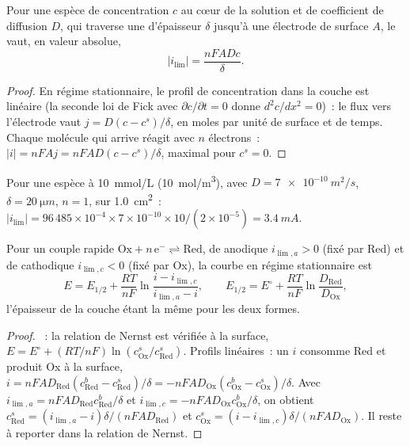 \begin{theorem}\label{thm:b2:current-potential-curves:limiting}
Pour une espèce de concentration $c$ au cœur de la solution et de coefficient de diffusion $D$,
qui traverse une  d'épaisseur $\delta$ jusqu'à une électrode de surface $A$,
le  vaut, en valeur absolue,
\[
  |i_{\lim}| = \frac{nFADc}{\delta} .
\]
\end{theorem}

\begin{proof}
En régime stationnaire, le profil de concentration dans la couche est linéaire (la seconde
loi de Fick avec $\partial c/\partial t = 0$ donne $d^2c/dx^2 = 0$)~: le flux
vers l'électrode vaut $j = D(c - c^s)/\delta$, en moles par unité de surface et de
temps. Chaque molécule qui arrive réagit avec $n$ électrons~: $|i| = nFAj =
nFAD(c - c^s)/\delta$, maximal pour $c^s = 0$.
\end{proof}

\begin{example}\label{ex:b2:current-potential-curves:ilim}
Pour une espèce à \qty{10}{mmol/L} (\qty{10}{mol/m^3}), avec $D =
\qty{7e-10}{m^2/s}$, $\delta = \qty{20}{\micro m}$, $n = 1$, sur
\qty{1.0}{cm^2}~: $|i_{\lim}| = 96\,485 \times 10^{-4} \times 7 \times 10^{-10}
\times 10/(2 \times 10^{-5}) = \qty{3.4}{mA}$.
\end{example}

\begin{theorem}\label{thm:b2:current-potential-curves:wave}
Pour un couple rapide $\mathrm{Ox} + n\,\mathrm e^- \rightleftharpoons \mathrm{Red}$,
de  anodique $i_{\lim,a} > 0$ (fixé par Red) et de 
cathodique $i_{\lim,c} < 0$ (fixé par Ox), la courbe en régime stationnaire est
\[
  E = E_{1/2} + \frac{RT}{nF}\ln\frac{i - i_{\lim,c}}{i_{\lim,a} - i},
  \qquad E_{1/2} = E^\circ + \frac{RT}{nF}\ln\frac{D_{\text{Red}}}{D_{\text{Ox}}} ,
\]
l'épaisseur de la couche étant la même pour les deux formes.
\end{theorem}

\begin{proof}
~: la relation de Nernst est vérifiée à la surface, $E = E^\circ + (RT/nF)
\ln(c^s_{\text{Ox}}/c^s_{\text{Red}})$. Profils linéaires~: un  $i$
consomme Red et produit Ox à la surface, $i = nFAD_{\text{Red}}(c^b_{\text{Red}}
- c^s_{\text{Red}})/\delta = -nFAD_{\text{Ox}}(c^b_{\text{Ox}} - c^s_{\text{Ox}})/\delta$.
Avec $i_{\lim,a} = nFAD_{\text{Red}}c^b_{\text{Red}}/\delta$ et $i_{\lim,c} =
-nFAD_{\text{Ox}}c^b_{\text{Ox}}/\delta$, on obtient $c^s_{\text{Red}} = (i_{\lim,a} -
i)\delta/(nFAD_{\text{Red}})$ et $c^s_{\text{Ox}} = (i - i_{\lim,c})\delta/(nFAD_{\text{Ox}})$.
Il reste à reporter dans la relation de Nernst.
\end{proof}

